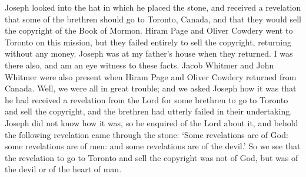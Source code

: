 \documentclass{article}
\begin{document}
Joseph looked into the hat in which he placed the stone, and received a 
revelation that some of the brethren should go to Toronto, Canada, and that 
they would sell the copyright of the Book of Mormon. Hiram Page and Oliver 
Cowdery went to Toronto on this mission, but they failed entirely to sell the 
copyright, returning without any money. Joseph was at my father's house when 
they returned. I was there also, and am an eye witness to these facts. Jacob 
Whitmer and John Whitmer were also present when Hiram Page and Oliver Cowdery 
returned from Canada. Well, we were all in great trouble; and we asked Joseph 
how it was that he had received a revelation from the Lord for some brethren to 
go to Toronto and sell the copyright, and the brethren had utterly failed in 
their undertaking. Joseph did not know how it was, so he enquired of the Lord 
about it, and behold the following revelation came through the stone: 
`Some revelations are of God: some revelations are of men: and some 
revelations are of the devil.' So we see that the revelation to go to 
Toronto and sell the copyright was not of God, but was of the devil 
or of the heart of man.

\cite{whitmer}

\newpage

\printbibliography
\thispagestyle{empty}
\end{document}
